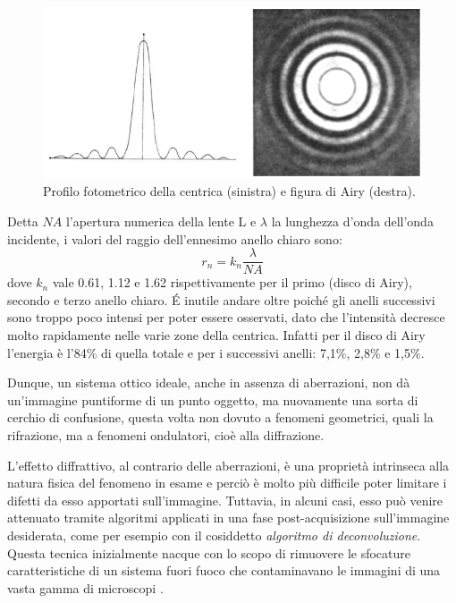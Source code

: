 \begin{figure}
 \centering
 \includegraphics[scale=.55]{img/CAP2diff2.png}
 \caption{\small{Profilo fotometrico della centrica (sinistra) e figura di Airy (destra).}}
 \label{fig:diff2}
\end{figure}

Detta $NA$ l'apertura numerica della lente L e $\lambda$ la lunghezza d'onda dell'onda incidente, i valori del raggio dell'ennesimo anello chiaro sono:
$$r_n = k_n \frac{\lambda}{NA} $$
dove $k_n$ vale 0.61, 1.12 e 1.62 rispettivamente per il primo (disco di Airy), secondo e terzo anello chiaro.
\'E inutile andare oltre poiché gli anelli successivi sono troppo poco intensi per poter essere osservati, dato che l'intensità decresce molto rapidamente nelle varie zone della centrica. 
Infatti per il  disco di Airy l'energia è l'84\% di quella totale e per i successivi anelli: 7,1\%, 2,8\% e 1,5\%.

Dunque, un sistema ottico ideale, anche in assenza di aberrazioni, non dà un'immagine puntiforme di un punto oggetto, ma nuovamente una sorta di cerchio di confusione, questa volta non dovuto a fenomeni geometrici, quali la rifrazione, ma a fenomeni ondulatori, cioè alla diffrazione.

L'effetto diffrattivo, al contrario delle aberrazioni, è una proprietà intrinseca alla natura fisica del fenomeno in esame e perciò è molto più difficile poter limitare i difetti da esso apportati sull'immagine. 
Tuttavia, in alcuni casi, esso può venire attenuato tramite algoritmi applicati in una fase post-acquisizione sull'immagine desiderata, come per esempio con il cosiddetto \textit{algoritmo di deconvoluzione}.
Questa  tecnica inizialmente nacque con lo scopo di rimuovere le sfocature caratteristiche di un sistema fuori fuoco che contaminavano le immagini di una vasta gamma di microscopi \cite{decon}. 

